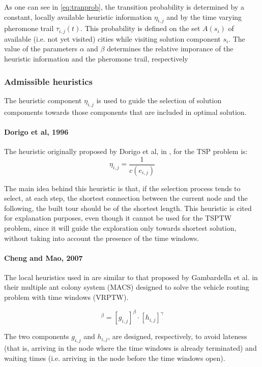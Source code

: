 \begin{homeworkProblem}
As one can see in \ref{eq:tranprob}, the transition probability is determined by a constant, locally available heuristic information $\eta_{i,j}$ and by the time varying pheromone trail $\tau_{i,j}(t)$.
This probability is defined on the set $A(s_i)$ of available (i.e. not yet visited) cities while visiting solution component $s_i$.
The value of the parameters $\alpha$ and $\beta$ determines the relative imporance of the heuristic information and the pheromone trail, respectively

\subsubsection{Admissible heuristics}
The heuristic component $\eta_{i,j}$ is used to guide the selection of solution compoments towards those components that are included in optimal solution.

\paragraph{Dorigo et al, 1996}
The heuristic originally proposed by Dorigo et al, in \cite{dorigo1996ant}, for the TSP problem is:
\begin{equation}
  \eta_{i,j} = \frac{1}{c(e_{i,j})}
\end{equation}

The main idea behind this heuristic is that, if the selection process tends to select, at each step, the shortest connection between the current node and the following, the built tour should be of the shortest length.
This heuristic is cited for explanation purposes, even though it cannot be used for the TSPTW problem, since it will guide the exploration only towards shortest solution, without taking into account the presence of the time windows.

\paragraph{Cheng and Mao, 2007}
The local heuristics used in \cite{cheng2007modified} are similar to that proposed by Gambardella et al. \cite{gambardella1999macs} in their multiple ant colony system (MACS) designed to solve the vehicle routing problem with time windows (VRPTW).

\begin{equation}
[\eta_{i,j}]^\beta = [g_{i,j}]^\beta \cdot [h_{i,j}]^\gamma
\end{equation}  

The two components $g_{i,j}$ and $h_{i,j}$, are designed, respectively, to avoid lateness (that is, arriving in the node where the time windows is already terminated) and waiting times (i.e. arriving in the node before the time windows open).


\end{homeworkProblem}
